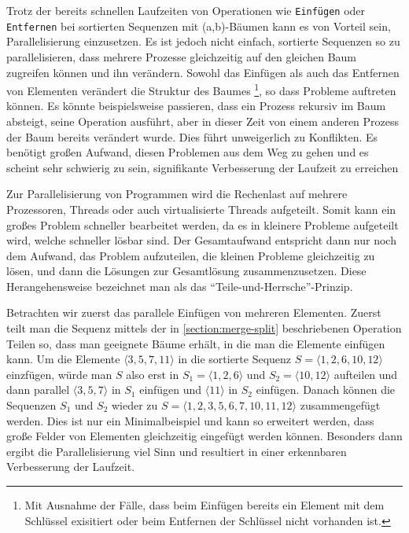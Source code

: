 Trotz der bereits schnellen Laufzeiten von Operationen wie \texttt{Einfügen} oder \texttt{Entfernen} bei sortierten Sequenzen mit (a,b)-Bäumen kann es von Vorteil sein, Parallelisierung einzusetzen. Es ist jedoch nicht einfach, sortierte Sequenzen so zu parallelisieren, dass mehrere Prozesse gleichzeitig auf den gleichen Baum zugreifen können und ihn verändern. Sowohl das Einfügen als auch das Entfernen von Elementen verändert die Struktur des Baumes \footnote{Mit Ausnahme der Fälle, dass beim Einfügen bereits ein Element mit dem Schlüssel exisitiert oder beim Entfernen der Schlüssel nicht vorhanden ist.}, so dass Probleme auftreten können. Es könnte beispielsweise passieren, dass ein Prozess rekursiv im Baum absteigt, seine Operation ausführt, aber in dieser Zeit von einem anderen Prozess der Baum bereits verändert wurde. Dies führt unweigerlich zu Konflikten. Es benötigt großen Aufwand, diesen Problemen aus dem Weg zu gehen und es scheint sehr schwierig zu sein, signifikante Verbesserung der Laufzeit zu erreichen \cite{Sanders:19}
\par
Zur Parallelisierung von Programmen wird die Rechenlast auf mehrere Prozessoren, Threads oder auch virtualisierte Threads aufgeteilt. Somit kann ein großes Problem schneller bearbeitet werden, da es in kleinere Probleme aufgeteilt wird, welche schneller lösbar sind. Der Gesamtaufwand entspricht dann nur noch dem Aufwand, das Problem aufzuteilen, die kleinen Probleme gleichzeitig zu lösen, und dann die Lösungen zur Gesamtlösung zusammenzusetzen. Diese Herangehensweise bezeichnet man als das "`Teile-und-Herrsche"'-Prinzip.
\par
Betrachten wir zuerst das parallele Einfügen von mehreren Elementen. Zuerst teilt man die Sequenz mittels der in \autoref{section:merge-split} beschriebenen Operation Teilen so, dass man geeignete Bäume erhält, in die man die Elemente einfügen kann. Um die Elemente $\langle 3,5,7,11 \rangle$ in die sortierte Sequenz $S = \langle 1,2,6,10,12 \rangle$ einzfügen, würde man $S$ also erst in $S_1 = \langle 1,2,6 \rangle$ und $S_2 = \langle 10,12 \rangle$ aufteilen und dann parallel $\langle 3,5,7 \rangle$ in $S_1$ einfügen und $\langle 11 \rangle$ in $S_2$ einfügen. Danach können die Sequenzen $S_1$ und $S_2$ wieder zu $S = \langle 1,2,3,5,6,7,10,11,12 \rangle$ zusammengefügt werden. Dies ist nur ein Minimalbeispiel und kann so erweitert werden, dass große Felder von Elementen gleichzeitig eingefügt werden können. Besonders dann ergibt die Parallelisierung viel Sinn und resultiert in einer erkennbaren Verbesserung der Laufzeit. \cite{Sanders:19}
